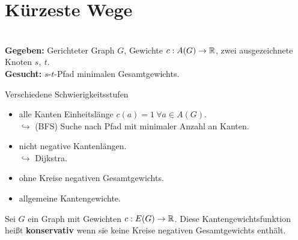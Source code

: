 \section{Kürzeste Wege}
\begin{problem}~\\[5pt]
	\hspace*{10pt}\textbf{Gegeben: }Gerichteter Graph $G$, Gewichte $c:A(G)\to \mathbb{R}$, zwei ausgezeichnete \hspace*{60pt} Knoten $s,~t$.\\[5pt]
	\hspace*{10pt}\textbf{Gesucht: }$s$-$t$-Pfad minimalen Gesamtgewichts.
\end{problem}
Verschiedene Schwierigkeitsstufen
\begin{itemize}
	\item alle Kanten Einheitslänge $c(a)=1~ \forall a\in A(G)$.\\
	$\hookrightarrow$ (BFS) Suche nach Pfad mit minimaler Anzahl an Kanten.
	\item nicht negative Kantenlängen.\\
	$\hookrightarrow$ Dijkstra.
	\item ohne Kreise negativen Gesamtgewichts.
	\item allgemeine Kantengewichte.
\end{itemize}
\begin{definition*}[Konservativ]
	Sei $G$ ein Graph mit Gewichten $c:E(G)\to \mathbb{R}$. Diese Kantengewichtsfunktion heißt \textbf{konservativ} wenn sie keine Kreise negativen Gesamtgewichts enthält.
\end{definition*}
